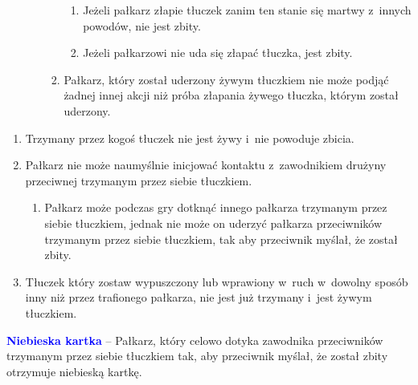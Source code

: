 \documentclass[12pt,a4paper]{article}
\renewcommand{\subsubsection}[1]{
  \oldsubsubsection{#1}%
  \leftskip1.3cm
}
\newcommand\bluecard[1]{\bgroup\textcolor{blue}{\textbf{#1}}}
\begin{document}
\begin{enumerate}
\begin{enumerate}
\begin{enumerate}
			                  \begin{enumerate}
				                  \item
				                        Jeżeli pałkarz złapie tłuczek zanim ten stanie się martwy z~innych powodów, nie jest zbity.
				                  \item
				                        Jeżeli pałkarzowi nie uda się złapać tłuczka, jest zbity.
			                  \end{enumerate}
			            \item
			                  Pałkarz, który został uderzony żywym tłuczkiem nie może podjąć
			                  żadnej innej akcji niż próba złapania żywego tłuczka, którym
			                  został uderzony.
		            \end{enumerate}
	      \end{enumerate}
\end{enumerate}

\subsubsection{Dotykanie tłuczkiem}

\begin{enumerate}
	\item
	      Trzymany przez kogoś tłuczek nie jest żywy i~nie powoduje zbicia.
	\item
	      Pałkarz nie może naumyślnie inicjować kontaktu z~zawodnikiem drużyny
	      przeciwnej trzymanym przez siebie tłuczkiem.

	      \begin{enumerate}
		      \item
		            Pałkarz może podczas gry dotknąć innego pałkarza trzymanym przez
		            siebie tłuczkiem, jednak nie może on uderzyć pałkarza przeciwników
		            trzymanym przez siebie tłuczkiem, tak aby przeciwnik myślał, że
		            został zbity.
	      \end{enumerate}
	\item
	      Tłuczek który zostaw wypuszczony lub wprawiony w~ruch w~dowolny sposób
	      inny niż przez trafionego pałkarza, nie jest już trzymany i~jest żywym
	      tłuczkiem.
\end{enumerate}

\bluecard{Niebieska kartka} -- Pałkarz, który celowo dotyka zawodnika
przeciwników trzymanym przez siebie tłuczkiem tak, aby przeciwnik
myślał, że został zbity otrzymuje niebieską kartkę.
\end{document}
